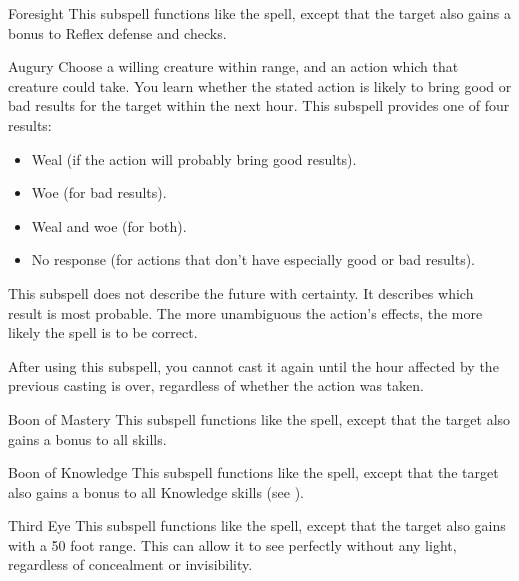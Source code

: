 \begin{ability}[\nth{2}]{Foresight}
This subspell functions like the  spell, except that the target also gains a  bonus to Reflex defense and  checks.
\end{ability}
\vspace{0.25em}


\begin{ability}[\nth{3}]{Augury}
Choose a willing creature within \rngclose range, and an action which that creature could take.
You learn whether the stated action is likely to bring good or bad results for the target within the next hour.
This subspell provides one of four results:
\begin{itemize}
\item Weal (if the action will probably bring good results).
\item Woe (for bad results).
\item Weal and woe (for both).
\item No response (for actions that don't have especially good or bad results).
\end{itemize}

This subspell does not describe the future with certainty.
It describes which result is most probable.
The more unambiguous the action's effects, the more likely the spell is to be correct.

After using this subspell, you cannot cast it again until the hour affected by the previous casting is over, regardless of whether the action was taken.
\end{ability}
\vspace{0.25em}


\begin{ability}[\nth{3}]{Boon of Mastery}
This subspell functions like the  spell, except that the target also gains a  bonus to all skills.
\end{ability}
\vspace{0.25em}


\begin{ability}[\nth{4}]{Boon of Knowledge}
This subspell functions like the  spell, except that the target also gains a  bonus to all Knowledge skills (see ).
\end{ability}
\vspace{0.25em}


\begin{ability}[\nth{4}]{Third Eye}
This subspell functions like the  spell, except that the target also gains  with a 50 foot range.
This can allow it to see perfectly without any light, regardless of concealment or invisibility.
\end{ability}
\vspace{0.25em}



